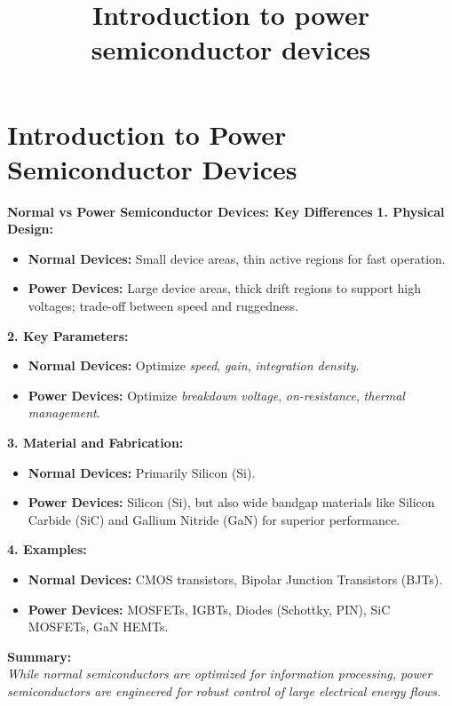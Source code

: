 \section{Introduction to Power Semiconductor Devices}
\title[Introduction to power semiconductor devices]{Introduction to power semiconductor devices}  

\begin{frame}[plain]
    \titlepage
\end{frame}

\begin{frame}{\textbf{Normal vs Power Semiconductor Devices: Key Differences}}
    \textbf{1. Physical Design:}
    \begin{itemize}
        \item \textbf{Normal Devices:} Small device areas, thin active regions for fast operation.
        \item \textbf{Power Devices:} Large device areas, thick drift regions to support high voltages; trade-off between speed and ruggedness.
    \end{itemize}

    \textbf{2. Key Parameters:}
    \begin{itemize}
        \item \textbf{Normal Devices:} Optimize \textit{speed}, \textit{gain}, \textit{integration density}.
        \item \textbf{Power Devices:} Optimize \textit{breakdown voltage}, \textit{on-resistance}, \textit{thermal management}.
    \end{itemize}

    \textbf{3. Material and Fabrication:}
    \begin{itemize}
        \item \textbf{Normal Devices:} Primarily Silicon (Si).
        \item \textbf{Power Devices:} Silicon (Si), but also wide bandgap materials like Silicon Carbide (SiC) and Gallium Nitride (GaN) for superior performance.
    \end{itemize}

    \textbf{4. Examples:}
    \begin{itemize}
        \item \textbf{Normal Devices:} CMOS transistors, Bipolar Junction Transistors (BJTs).
        \item \textbf{Power Devices:} MOSFETs, IGBTs, Diodes (Schottky, PIN), SiC MOSFETs, GaN HEMTs.
    \end{itemize}

    \vspace{0.3cm}
    \textbf{Summary:} \\
    \textit{While normal semiconductors are optimized for information processing, power semiconductors are engineered for robust control of large electrical energy flows.}
\end{frame}


